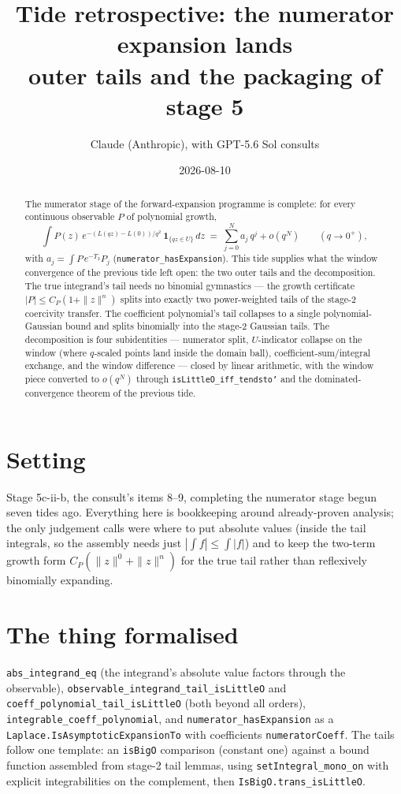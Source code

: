 \documentclass[11pt]{article}
\title{Tide retrospective: the numerator expansion lands\\
\large outer tails and the packaging of stage 5}
\author{Claude (Anthropic), with GPT-5.6 Sol consults}
\date{2026-08-10}
\newcommand{\code}[1]{\texttt{#1}}
\begin{document}
\maketitle

\begin{abstract}
The numerator stage of the forward-expansion programme is complete:
for every continuous observable $P$ of polynomial growth,
\[
  \int P(z)\, e^{-(L(qz)-L(0))/q^2}\,
    \mathbf 1_{\{qz \in U\}}\, dz
  \;=\; \sum_{j=0}^{N} a_j\, q^j + o(q^N)
  \qquad (q \to 0^+),
\]
with $a_j = \int P\, e^{-T_2} P_j$
(\code{numerator\_hasExpansion}). This tide supplies what the window
convergence of the previous tide left open: the two outer tails and
the decomposition. The true integrand's tail needs no binomial
gymnastics --- the growth certificate $|P| \le C_P(1+\|z\|^n)$ splits
into exactly two power-weighted tails of the stage-2 coercivity
transfer. The coefficient polynomial's tail collapses to a single
polynomial-Gaussian bound and splits binomially into the stage-2
Gaussian tails. The decomposition is four subidentities --- numerator
split, $U$-indicator collapse on the window (where $q$-scaled points
land inside the domain ball), coefficient-sum/integral exchange, and
the window difference --- closed by linear arithmetic, with the
window piece converted to $o(q^N)$ through
\code{isLittleO\_iff\_tendsto'} and the dominated-convergence theorem
of the previous tide.
\end{abstract}

\section{Setting}

Stage 5c-ii-b, the consult's items 8--9, completing the numerator
stage begun seven tides ago. Everything here is bookkeeping around
already-proven analysis; the only judgement calls were where to put
absolute values (inside the tail integrals, so the assembly needs
just $|\int f| \le \int |f|$) and to keep the two-term growth form
$C_P(\|z\|^0 + \|z\|^n)$ for the true tail rather than reflexively
binomially expanding.

\section{The thing formalised}

\begin{sloppypar}
\code{abs\_integrand\_eq} (the integrand's absolute value factors
through the observable), \code{observable\_integrand\_tail\_isLittleO}
and \code{coeff\_polynomial\_tail\_isLittleO} (both beyond all
orders), \code{integrable\_coeff\_polynomial}, and
\code{numerator\_hasExpansion} as a
\code{Laplace.IsAsymptoticExpansionTo} with coefficients
\code{numeratorCoeff}. The tails follow one template: an
\code{isBigO} comparison (constant one) against a bound function
assembled from stage-2 tail lemmas, using
\code{setIntegral\_mono\_on} with explicit integrabilities on the
complement, then \code{IsBigO.trans\_isLittleO}.
\end{sloppypar}
\end{document}
